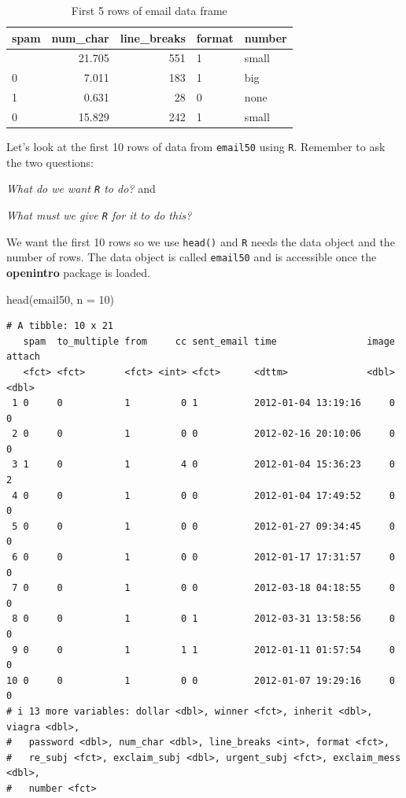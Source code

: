 \documentclass[
  letterpaper,
  DIV=11,
  numbers=noendperiod]{scrreprt}
\newenvironment{Shaded}{\begin{snugshade}}{\end{snugshade}}
\newcommand{\AttributeTok}[1]{\textcolor[rgb]{0.40,0.45,0.13}{#1}}
\newcommand{\DecValTok}[1]{\textcolor[rgb]{0.68,0.00,0.00}{#1}}
\newcommand{\FunctionTok}[1]{\textcolor[rgb]{0.28,0.35,0.67}{#1}}
\newcommand{\NormalTok}[1]{\textcolor[rgb]{0.00,0.23,0.31}{#1}}
\begin{document}
\begin{longtable}[]{@{}lrrll@{}}

\caption{\label{tbl-db1}First 5 rows of email data frame}

\tabularnewline

\toprule\noalign{}
spam & num\_char & line\_breaks & format & number \\
\midrule\noalign{}
\endhead
\bottomrule\noalign{}
\endlastfoot
0 & 21.705 & 551 & 1 & small \\
0 & 7.011 & 183 & 1 & big \\
1 & 0.631 & 28 & 0 & none \\
0 & 15.829 & 242 & 1 & small \\

\end{longtable}

Let's look at the first 10 rows of data from \texttt{email50} using
\texttt{R}. Remember to ask the two questions:

\emph{What do we want \texttt{R} to do?} and

\emph{What must we give \texttt{R} for it to do this?}

We want the first 10 rows so we use \texttt{head()} and \texttt{R} needs
the data object and the number of rows. The data object is called
\texttt{email50} and is accessible once the \textbf{openintro} package
is loaded.

\begin{Shaded}
\begin{Highlighting}[]
\FunctionTok{head}\NormalTok{(email50, }\AttributeTok{n =} \DecValTok{10}\NormalTok{)}
\end{Highlighting}
\end{Shaded}

\begin{verbatim}
# A tibble: 10 x 21
   spam  to_multiple from     cc sent_email time                image attach
   <fct> <fct>       <fct> <int> <fct>      <dttm>              <dbl>  <dbl>
 1 0     0           1         0 1          2012-01-04 13:19:16     0      0
 2 0     0           1         0 0          2012-02-16 20:10:06     0      0
 3 1     0           1         4 0          2012-01-04 15:36:23     0      2
 4 0     0           1         0 0          2012-01-04 17:49:52     0      0
 5 0     0           1         0 0          2012-01-27 09:34:45     0      0
 6 0     0           1         0 0          2012-01-17 17:31:57     0      0
 7 0     0           1         0 0          2012-03-18 04:18:55     0      0
 8 0     0           1         0 1          2012-03-31 13:58:56     0      0
 9 0     0           1         1 1          2012-01-11 01:57:54     0      0
10 0     0           1         0 0          2012-01-07 19:29:16     0      0
# i 13 more variables: dollar <dbl>, winner <fct>, inherit <dbl>, viagra <dbl>,
#   password <dbl>, num_char <dbl>, line_breaks <int>, format <fct>,
#   re_subj <fct>, exclaim_subj <dbl>, urgent_subj <fct>, exclaim_mess <dbl>,
#   number <fct>
\end{verbatim}
\end{document}
